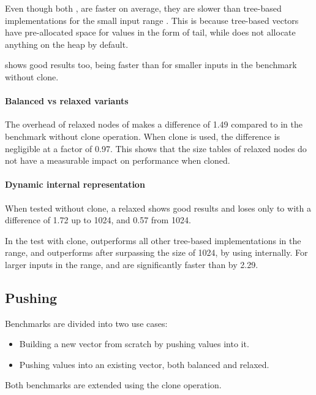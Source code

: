 Even though both \stdvec{}, \pvec{} are faster on average, they are slower than tree-based implementations for the small input range \range{[10, 100]}. This is because tree-based vectors have pre-allocated space for values in the form of tail, while \stdvec{} does not allocate anything on the heap by default. 

\imrsvec{} shows good results too, being faster than \rrbvec{} for smaller inputs in the benchmark without clone. 

\paragraph{Balanced vs relaxed variants}
The overhead of relaxed nodes of \rrbtree{} makes a difference of 1.49 compared to \rbtree{} in the benchmark without clone operation. When clone is used, the difference is negligible at a factor of 0.97. This shows that the size tables of relaxed nodes do not have a measurable impact on performance when cloned.

\paragraph{Dynamic internal representation}
When tested without clone, a relaxed \pvec{} shows good results and loses only to \stdvec{} with a difference of 1.72 up to 1024, and 0.57 from 1024.

In the test with clone, \pvec{} outperforms all other tree-based implementations in the \range{[100, \kilo{1}]} range, and outperforms \stdvec{} after surpassing the size of 1024, by using \rrbvec{} internally. For larger inputs in the  range, \pvec{} and \rrbvec{} are significantly faster than \stdvec{} by 2.29. 

\subsection{Pushing}
Benchmarks are divided into two use cases:
\begin{itemize}
    \item Building a new vector from scratch by pushing values into it. 
    \item Pushing values into an existing vector, both balanced and relaxed. 
\end{itemize}

Both benchmarks are extended using the clone operation. 

